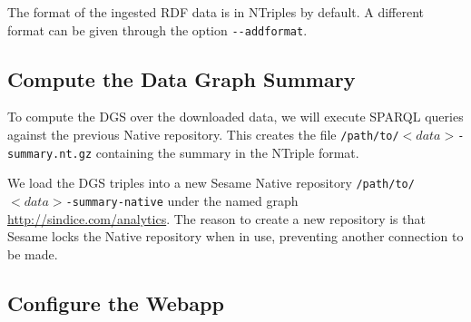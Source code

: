 The format of the ingested RDF data is in NTriples by default. A different format can be given through the option \texttt{\mbox{-{}-addformat}}.

\subsection{Compute the Data Graph Summary}

To compute the DGS over the downloaded data, we will execute SPARQL queries against the previous Native repository. This creates the file \texttt{/path/to/\mbox{$<\!data\!>$}-summary.nt.gz} containing the summary in the NTriple format.

\bigskip
\begin{raggedleft}
\end{raggedleft}
\hfill

We load the DGS triples into a new Sesame Native repository \texttt{/path/to/\mbox{$<\!data\!>$}-summary-native} under the named graph \url{http://sindice.com/analytics}. The reason to create a new repository is that Sesame locks the Native repository when in use, preventing another connection to be made.

\bigskip
\begin{raggedleft}
\end{raggedleft}
\hfill

\subsection{Configure the Webapp}

